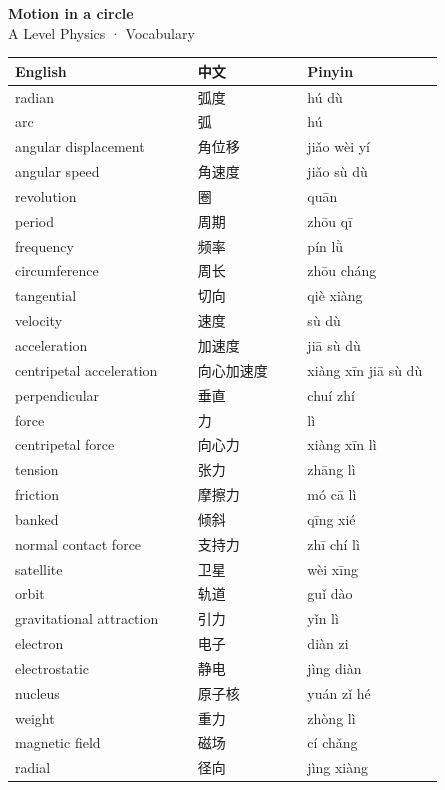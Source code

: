 \documentclass[11pt]{article}
\begin{document}
\begin{center}
  {\LARGE\bfseries Motion in a circle}\\[0.35em]
  {\large A Level Physics · Vocabulary}
\end{center}
\vspace{0.6em}

\begin{longtable}{@{}p{0.40\linewidth}p{0.24\linewidth}p{0.30\linewidth}@{}}
\toprule
\textbf{English} & \textbf{中文} & \textbf{Pinyin} \\
\midrule
\endhead
\bottomrule
\endlastfoot
radian & 弧度 & hú dù \\
arc & 弧 & hú \\
angular displacement & 角位移 & jiǎo wèi yí \\
angular speed & 角速度 & jiǎo sù dù \\
revolution & 圈 & quān \\
period & 周期 & zhōu qī \\
frequency & 频率 & pín lǜ \\
circumference & 周长 & zhōu cháng \\
tangential & 切向 & qiè xiàng \\
velocity & 速度 & sù dù \\
acceleration & 加速度 & jiā sù dù \\
centripetal acceleration & 向心加速度 & xiàng xīn jiā sù dù \\
perpendicular & 垂直 & chuí zhí \\
force & 力 & lì \\
centripetal force & 向心力 & xiàng xīn lì \\
tension & 张力 & zhāng lì \\
friction & 摩擦力 & mó cā lì \\
banked & 倾斜 & qīng xié \\
normal contact force & 支持力 & zhī chí lì \\
satellite & 卫星 & wèi xīng \\
orbit & 轨道 & guǐ dào \\
gravitational attraction & 引力 & yǐn lì \\
electron & 电子 & diàn zi \\
electrostatic & 静电 & jìng diàn \\
nucleus & 原子核 & yuán zǐ hé \\
weight & 重力 & zhòng lì \\
magnetic field & 磁场 & cí chǎng \\
radial & 径向 & jìng xiàng \\
\end{longtable}
\end{document}
